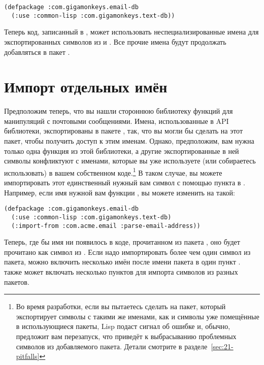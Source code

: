 \begin{lstlisting}
(defpackage :com.gigamonkeys.email-db
  (:use :common-lisp :com.gigamonkeys.text-db))
\end{lstlisting}

Теперь код, записанный в , может использовать
неспециализированные имена для экспортированных символов из  и
. Все прочие имена будут продолжать добавляться в пакет
.

\section{Импорт отдельных имён}

Предположим теперь, что вы нашли стороннюю библиотеку функций для манипуляций с почтовыми
сообщениями. Имена, использованные в API библиотеки, экспортированы в пакете
, так, что вы могли бы сделать  на этот пакет, чтобы
получить доступ к этим именам. Однако, предположим, вам нужна только одна функция из этой
библиотеки, а другие экспортированные в ней символы конфликтуют с именами, которые вы уже
используете (или собираетесь использовать) в вашем собственном коде.\footnote{Во время
  разработки, если вы пытаетесь сделать  на пакет, который экспортирует символы
  с такими же именами, как и символы уже помещённые в использующиеся пакеты, Lisp подаст
  сигнал об ошибке и, обычно, предложит вам перезапуск, что приведёт к выбрасыванию
  проблемных символов из добавляемого пакета. Детали смотрите в
  разделе~\ref{sec:21-pitfalls}} В таком случае, вы можете импортировать этот единственный
нужный вам символ с помощью пункта  в . Например, если
имя нужной вам функции , вы можете изменить  на
такой:

\begin{lstlisting}
(defpackage :com.gigamonkeys.email-db
  (:use :common-lisp :com.gigamonkeys.text-db)
  (:import-from :com.acme.email :parse-email-address))
\end{lstlisting}

Теперь, где бы имя  ни появилось в коде, прочитанном из пакета
, оно будет прочитано как символ из
. Если надо импортировать более чем один символ из пакета, можно
включить несколько имён после имени пакета в один пункт .
 также может включать несколько пунктов  для импорта
символов из разных пакетов.

